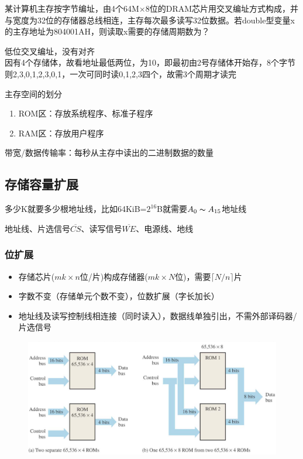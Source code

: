 \begin{example}[2017全国统考]
某计算机主存按字节编址，由4个64M$\times$8位的DRAM芯片用交叉编址方式构成，并与宽度为32位的存储器总线相连，主存每次最多读写32位数据。若double型变量x的主存地址为804001AH，则读取x需要的存储周期数为？
\end{example}
\begin{analysis}
低位交叉编址，没有对齐\\
因有4个存储体，故看地址最低两位，为10，即最初由2号存储体开始存，8个字节则2,3,0,1,2,3,0,1，一次可同时读0,1,2,3四个，故需3个周期才读完
\end{analysis}
主存空间的划分
\begin{enumerate}
	\item ROM区：存放系统程序、标准子程序
	\item RAM区：存放用户程序
\end{enumerate}
带宽/数据传输率：每秒从主存中读出的二进制数据的数量

\subsection{存储容量扩展}
多少K就要多少根地址线，比如64KiB=$2^16$B就需要$A_0\thicksim A_{15}$地址线
\par 地址线、片选信号$\overline{CS}$、读写信号$\overline{WE}$、电源线、地线
\subsubsection{位扩展}
\begin{itemize}
	\item 存储芯片($mk\times n$位/片)构成存储器($mk\times N$位)，需要$\lceil N/n\rceil$片
	\item 字数不变（存储单元个数不变），位数扩展（字长加长）
	\item 地址线及读写控制线相连接（同时读入），数据线单独引出，不需外部译码器/片选信号
\end{itemize}
\begin{figure}[H]
\centering
\includegraphics[width=0.6\linewidth]{fig/word-length.PNG}
\end{figure}

